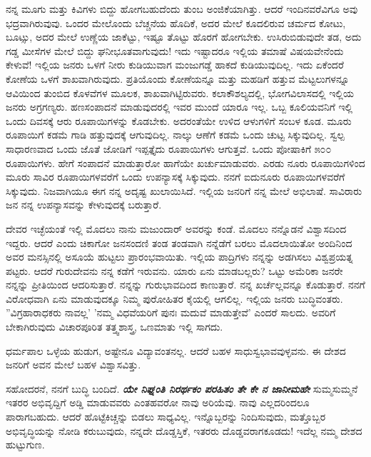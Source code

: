 ನನ್ನ ಮೂಗು ಮತ್ತು ಕಿವಿಗಳು ಬಿದ್ದು ಹೋಗಬಹುದೆಂದು ತುಂಬ ಅಂಜಿಕೆಯಾಗಿತ್ತು. ಆದರೆ ಇಂದಿನವರೆವಿಗೂ ಅವು ಭದ್ರವಾಗಿರುವುವು. ಒಂದರ ಮೇಲೊಂದು ಬೆಚ್ಚನೆಯ ಹೊದಿಕೆ, ಅದರ ಮೇಲೆ ಕೂದಲಿರುವ ಚರ್ಮದ ಕೋಟು, ಬೂಟ್ಸು, ಅದರ ಮೇಲೆ ಉಣ್ಣೆಯ ಜಾಕೆಟ್ಟು, ಇಷ್ಟೂ ತೊಟ್ಟು ಹೊರಗೆ ಹೋಗಬೇಕು. ಉಸಿರುಬಿಡುವುದೇ ತಡ, ಅದು ಗಡ್ಡ ಮೀಸೆಗಳ ಮೇಲೆ ಬಿದ್ದು ಘನೀಭೂತವಾಗುವುದು! ಇದು ಇಷ್ಟಾದರೂ ಇಲ್ಲಿಯ ತಮಾಷೆ ವಿಷಯವೇನೆಂದು ಕೇಳುವೆ! ಇಲ್ಲಿಯ ಜನರು ಒಳಗೆ ನೀರು ಕುಡಿಯುವಾಗ ಮಂಜುಗಡ್ಡೆ ಹಾಕದೆ ಕುಡಿಯುವುದಿಲ್ಲ. ಇದು ಏಕೆಂದರೆ ಕೋಣೆಯ ಒಳಗೆ ಶಾಖವಾಗಿರುವುದು. ಪ್ರತಿಯೊಂದು ಕೋಣೆಯನ್ನೂ ಮತ್ತು ಮಹಡಿಗೆ ಹತ್ತುವ ಮೆಟ್ಟಲುಗಳನ್ನೂ ಆವಿಯಿಂದ ತುಂಬಿದ ಕೊಳವೆಗಳ ಮೂಲಕ, ಶಾಖವಾಗಿಟ್ಟಿರುವರು. ಕಲಾಕೌಶಲ್ಯದಲ್ಲಿ, ಭೋಗವಿಲಾಸದಲ್ಲಿ ಇಲ್ಲಿಯ ಜನರು ಅಗ್ರಗಣ್ಯರು. ಹಣಸಂಪಾದನೆ ಮಾಡುವುದರಲ್ಲಿ ಇವರ ಮುಂದೆ ಯಾರೂ ಇಲ್ಲ. ಒಬ್ಬ ಕೂಲಿಯವನಿಗೆ ಇಲ್ಲಿ ಒಂದು ದಿವಸಕ್ಕೆ ಆರು ರೂಪಾಯಿಗಳನ್ನು ಕೊಡಬೇಕು. ಅದರಂತೆಯೇ ಉಳಿದ ಆಳುಗಳಿಗೆ ಸಂಬಳ ಕೂಡ. ಮೂರು ರೂಪಾಯಿಗೆ ಕಡಮೆ ಗಾಡಿ ಹತ್ತುವುದಕ್ಕೆ ಆಗುವುದಿಲ್ಲ. ನಾಲ್ಕು ಆಣೆಗೆ ಕಡಮೆ ಒಂದು ಚುಟ್ಟ ಸಿಕ್ಕುವುದಿಲ್ಲ. ಸ್ವಲ್ಪ ಸಾಧಾರಣವಾದ ಒಂದು ಜೊತೆ ಜೋಡಿಗೆ ಇಪ್ಪತ್ತೈದು ರೂಪಾಯಿಗಳು ಆಗುತ್ತವೆ. ಒಂದು ಪೋಷಾಕಿಗೆ ೫೦೦ ರೂಪಾಯಿಗಳು. ಹೇಗೆ ಸಂಪಾದನೆ ಮಾಡುತ್ತಾರೋ ಹಾಗೆಯೇ ಖರ್ಚುಮಾಡುವರು. ಎರಡು ನೂರು ರೂಪಾಯಿಗಳಿಂದ ಮೂರು ಸಾವಿರ ರೂಪಾಯಿಗಳವರೆಗೆ ಒಂದು ಉಪನ್ಯಾಸಕ್ಕೆ ಸಿಕ್ಕುವುದು. ನನಗೆ ಐದುನೂರು ರೂಪಾಯಿಗಳವರೆಗೆ ಸಿಕ್ಕುವುದು. ನಿಜವಾಗಿಯೂ ಈಗ ನನ್ನ ಅದೃಷ್ಟ ಖುಲಾಯಿಸಿದೆ. ಇಲ್ಲಿಯ ಜನರಿಗೆ ನನ್ನ ಮೇಲೆ ಅಭಿಲಾಷೆ. ಸಾವಿರಾರು ಜನ ನನ್ನ ಉಪನ್ಯಾಸವನ್ನು ಕೇಳುವುದಕ್ಕೆ ಬರುತ್ತಾರೆ.

ದೇವರ ಇಚ್ಛೆಯಂತೆ ಇಲ್ಲಿ ಮೊದಲು ನಾನು ಮಜುಂದಾರ್ ಅವರನ್ನು ಕಂಡೆ. ಮೊದಲು ನನ್ನೊಡನೆ ವಿಶ್ವಾಸದಿಂದ ಇದ್ದರು. ಆದರೆ ಎಂದು ಚಿಕಾಗೋ ಜನಸಂದಣಿ ತಂಡ ತಂಡವಾಗಿ ನನ್ನೆಡೆಗೆ ಬರಲು ಮೊದಲಾಯಿತೋ ಅಂದಿನಿಂದ ಅವರ ಮನಸ್ಸಿನಲ್ಲಿ ಅಸೂಯೆ ಹುಟ್ಟಲು ಪ್ರಾರಂಭವಾಯಿತು. ಇಲ್ಲಿಯ ಪಾದ್ರಿಗಳು ನನ್ನನ್ನು ಅಡಗಿಸಲು ವಿಶ್ವಪ್ರಯತ್ನ ಪಟ್ಟರು. ಆದರೆ ಗುರುದೇವನು ನನ್ನ ಕಡೆಗೆ ಇರುವನು. ಯಾರು ಏನು ಮಾಡಬಲ್ಲರು? ಒಟ್ಟು ಅಮೆರಿಕಾ ಜನರೇ ನನ್ನನ್ನು ಪ್ರೀತಿಯಿಂದ ಆದರಿಸುತ್ತಾರೆ. ನನ್ನನ್ನು ಗುರುಭಾವದಿಂದ ಕಾಣುತ್ತಾರೆ. ನನ್ನ ಖರ್ಚೆಲ್ಲವನ್ನೂ ಕೊಡುತ್ತಾರೆ. ನನಗೆ ವಿರೋಧವಾಗಿ ಏನು ಮಾಡುವುದಕ್ಕೂ ನಿಮ್ಮ ಪುರೋಹಿತರ ಕೈಯಲ್ಲಿ ಆಗಲಿಲ್ಲ. ಇಲ್ಲಿಯ ಜನರು ಬುದ್ಧಿವಂತರು. ”ವಿಗ್ರಹಾರಾಧಕರು ನಾವಲ್ಲ’ ’ನಮ್ಮ ವಿಧವೆಯರಿಗೆ ಪುನಃ ಮದುವೆ ಮಾಡುತ್ತೇವೆ’ ಎಂದರೆ ಸಾಲದು. ಅವರಿಗೆ ಬೇಕಾಗಿರುವುದು ವಿಚಾರಪೂರಿತ ತತ್ತ್ವಶಾಸ್ತ್ರ, ಒಣಮಾತು ಇಲ್ಲಿ ಸಾಗದು.

ಧರ್ಮಪಾಲ ಒಳ್ಳೆಯ ಹುಡುಗ, ಅಷ್ಟೇನೂ ವಿದ್ಯಾವಂತನಲ್ಲ. ಆದರೆ ಬಹಳ ಸಾಧುಸ್ವಭಾವವುಳ್ಳವನು. ಈ ದೇಶದ ಜನರಿಗೆ ಅವನ ಮೇಲೆ ಬಹಳ ವಿಶ್ವಾಸವಿತ್ತು.

ಸಹೋದರನೆ, ನನಗೆ ಬುದ್ಧಿ ಬಂದಿದೆ. \textbf{\textit{ಯೇ ನಿಘ್ನಂತಿ ನಿರರ್ಥಕಂ ಪರಹಿತಂ ತೇ ಕೇ ನ ಜಾನೀಮಹೇ}} ಸುಮ್ಮಸುಮ್ಮನೆ ಇತರರ ಅಭಿವೃದ್ದಿಗೆ ಅಡ್ಡಿ ಮಾಡುವವರು ಎಂತಹವರೋ ನಾವು ಅರಿಯೆವು. ನಾವು ಎಲ್ಲದರಿಂದಲೂ ಪಾರಾಗಬಹುದು. ಆದರೆ ಹೊಟ್ಟೆಕಿಚ್ಚನ್ನು ಬಿಡಲು ಸಾಧ್ಯವಿಲ್ಲ. ಇನ್ನೊಬ್ಬರನ್ನು ನಿಂದಿಸುವುದು, ಮತ್ತೊಬ್ಬರ ಅಭಿವೃದ್ಧಿಯನ್ನು ನೋಡಿ ಕರುಬುವುದು, ನನ್ನದೇ ದೊಡ್ಡಸ್ತಿಕೆ, ಇತರರು ದೊಡ್ಡವರಾಗಕೂಡದು! ಇದೆಲ್ಲ ನಮ್ಮ ದೇಶದ ಹುಟ್ಟುಗುಣ.

